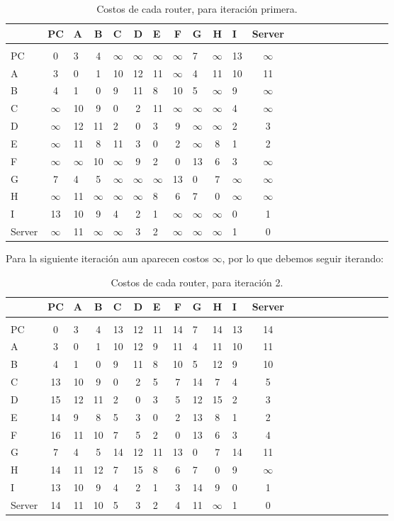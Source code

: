 \documentclass[a4papaer]{article}
\begin{document}
\begin{table}[h]
\centering
\begin{tabular}{lclclclclclclclclclclc}

& PC & A & B & C & D & E & F & G & H & I & Server \\\hline\\
PC&0&3&4&$\infty$&$\infty$&$\infty$&$\infty$&7&$\infty$&13&$\infty$ \\
A&3&0&1&10&12&11&$\infty$&4&11&10&11 \\
B&4&1&0&9&11&8&10&5&$\infty$&9&$\infty$ \\
C&$\infty$&10&9&0&2&11&$\infty$&$\infty$&$\infty$&4&$\infty$ \\
D&$\infty$&12&11&2&0&3&9&$\infty$&$\infty$&2&3 \\
E&$\infty$&11&8&11&3&0&2&$\infty$&8&1&2 \\
F&$\infty$&$\infty$&10&$\infty$&9&2&0&13&6&3&$\infty$ \\
G&7&4&5&$\infty$&$\infty$&$\infty$&13&0&7&$\infty$&$\infty$ \\
H&$\infty$&11&$\infty$&$\infty$&$\infty$&8&6&7&0&$\infty$&$\infty$ \\
I&13&10&9&4&2&1&$\infty$&$\infty$&$\infty$&0&1 \\
Server&$\infty$&11&$\infty$&$\infty$&3&2&$\infty$&$\infty$&$\infty$&1&0 \\

\end{tabular}
\caption{\label{tab:widgets}Costos de cada router, para iteración primera.}
\end{table}

Para la siguiente iteración aun aparecen costos $\infty$, por lo que debemos seguir iterando: 

\begin{table}[h]
\centering
\begin{tabular}{lclclclclclclclclclclc}

& PC & A & B & C & D & E & F & G & H & I & Server \\\hline\\
PC&0&3&4&13&12&11&14&7&14&13&14 \\
A&3&0&1&10&12&9&11&4&11&10&11 \\
B&4&1&0&9&11&8&10&5&12&9&10 \\
C&13&10&9&0&2&5&7&14&7&4&5 \\
D&15&12&11&2&0&3&5&12&15&2&3 \\
E&14&9&8&5&3&0&2&13&8&1&2 \\
F&16&11&10&7&5&2&0&13&6&3&4 \\
G&7&4&5&14&12&11&13&0&7&14&11 \\
H&14&11&12&7&15&8&6&7&0&9&$\infty$ \\
I&13&10&9&4&2&1&3&14&9&0&1 \\
Server&14&11&10&5&3&2&4&11&$\infty$&1&0 \\

\end{tabular}
\caption{\label{tab:widgets}Costos de cada router, para iteración 2.}
\end{table}
\end{document}

